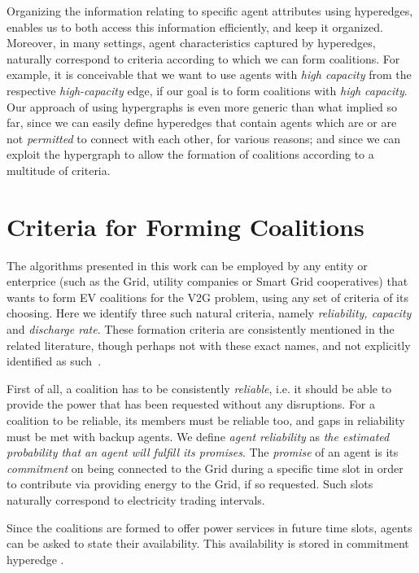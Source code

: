 Organizing the information relating to specific agent attributes using hyperedges, enables us to both access this information efficiently, and keep it organized.
Moreover, in many settings, agent characteristics captured by hyperedges, naturally correspond to criteria according to which we can form coalitions.
For example, it is conceivable that we want to use agents with {\em high capacity} from the respective {\em high-capacity} edge, if our goal is to form coalitions with {\em high capacity}. Our approach of using hypergraphs is even more generic than what implied so far, since we can easily define hyperedges that contain agents which are or are not {\em permitted} to connect with each other, for various reasons; and since we can exploit the hypergraph to allow the formation of coalitions according to a multitude of criteria.

\section{Criteria for Forming Coalitions}
\label{subsec:criteria}

The algorithms presented in this work can be employed by any entity or enterprice (such as the Grid, utility companies or Smart Grid cooperatives) that wants to form EV coalitions for the V2G problem, using any set of criteria of its choosing. Here we identify three such natural criteria, namely \textit{reliability, capacity} and \textit{discharge rate}. These formation criteria are consistently mentioned in the related literature, though perhaps not with these exact names, and not explicitly identified as such~\cite{kamboj2010exploring,kamboj2011deploying,valogianni2014effective}.

First of all, a coalition has to be consistently {\em reliable}, i.e. it should be able to provide the power that has been requested without any disruptions. For a coalition to be reliable, its members must be reliable too, and gaps in reliability must be met with backup agents. We define {\em agent reliability} as {\em the estimated probability that an agent will fulfill its promises}. The {\em promise} of an agent is its {\em commitment} on being connected to the Grid during a specific time slot in order to contribute via providing energy to the Grid, if so requested. Such slots naturally correspond to electricity trading intervals.

Since the coalitions are formed to offer power services in future time slots, agents can be asked to state their availability.
This availability is stored in commitment hyperedge .


